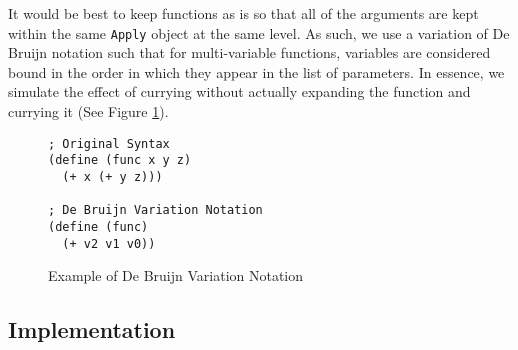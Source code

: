 \documentclass[12pt]{article}
\newcommand{\key}[1]{\texttt{#1}}
\begin{document}
It would be best to keep functions as is so that all of the arguments are kept within the same \key{Apply} object at the same level. As such, we use a variation of De Bruijn notation such that for multi-variable functions, variables are considered bound in the order in which they appear in the list of parameters. In essence, we simulate the effect of currying without actually expanding the function and currying it (See Figure \ref{fig:f5}).

\begin{figure}[H]
  \begin{mdframed}
    \begin{lstlisting}[escapechar=\%]
; Original Syntax
(define (func x y z)
  (+ x (+ y z)))

; De Bruijn Variation Notation
(define (func)
  (+ v2 v1 v0))
    \end{lstlisting}
  \end{mdframed}
  \caption{Example of De Bruijn Variation Notation}
  \label{fig:f5}
\end{figure}

\subsection{Implementation}
\end{document}
